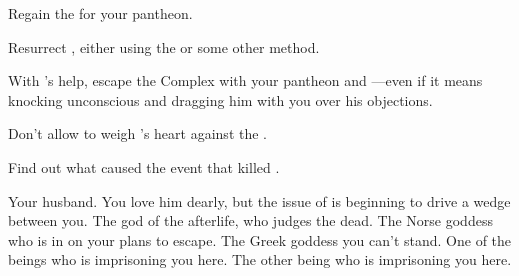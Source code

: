 \documentclass[char]{guardians}
\begin{document}
\begin{itemz}[Goals]
  \item Regain the \iNecro{} for your pantheon.
  \item Resurrect \cSet{}, either using the \iNecro{\MYname} or some other method.
  \item With \cSet{}'s help, escape the Complex with your pantheon and \cHel{}---even if it means knocking \cOsiris{} unconscious and dragging him with you over his objections.
  \item Don't allow \cAnubis{} to weigh \cEgyptianHuman{}'s heart against the \iFeather{\MYname}.
  \item Find out what caused the event that killed \cEgyptianHuman{}.
\end{itemz}

\begin{contacts}
  \contact{\cOsiris{}} Your husband. You love him dearly, but the issue of \cSet{} is beginning to drive a wedge between you.
  \contact{\cAnubis{}} The god of the afterlife, who judges the dead.
  \contact{\cHel{}} The Norse goddess who is in on your plans to escape.
  \contact{\cHera{}} The Greek goddess you can't stand.
  \contact{\cCaretaker{}} One of the beings who is imprisoning you here.
  \contact{\cWarden{}} The other being who is imprisoning you here.
\end{contacts}
\end{document}

